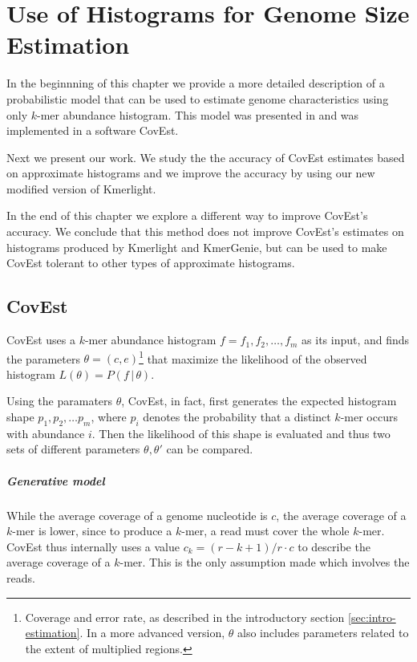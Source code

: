 \chapter{Use of Histograms for Genome Size Estimation}
\label{sec:chapter3}
In the beginnning of this chapter we provide a more detailed description of a probabilistic model
that can be used to estimate genome characteristics using only $k$-mer abundance histogram.
This model was presented in \cite{Hozza2015, Hozza2016} and was implemented in a software CovEst.

Next we present our work. We study the the accuracy of CovEst estimates based on
approximate histograms and we improve the accuracy by using our new modified version of Kmerlight.

In the end of this chapter we explore a different way to improve CovEst's accuracy. 
We conclude that this method does not improve CovEst's estimates on histograms produced by
Kmerlight and KmerGenie, but can be used to make CovEst tolerant to other types of
approximate histograms.

\section{CovEst}
\label{sec:covest}
CovEst uses a $k$-mer abundance histogram $f = f_1, f_2, \dots, f_m$ as its input,
and finds the parameters $\theta = (c, e)$\footnote{Coverage and error rate, as described 
in the introductory section \ref{sec:intro-estimation}. In a more advanced version, $\theta$
also includes parameters related to the extent of multiplied regions.} that maximize
the likelihood of the observed histogram $L(\theta) = P(f \,|\, \theta)$.

Using the paramaters $\theta$, CovEst, in fact, first generates the expected histogram
shape $p_1, p_2, \dots p_m$, where $p_i$ denotes the probability that a distinct $k$-mer
occurs with abundance $i$. Then the likelihood of this shape is evaluated and thus 
two sets of different parameters $\theta, \theta'$ can be compared.

\paragraph{Generative model}
While the average coverage of a genome nucleotide is $c$, the average coverage
of a $k$-mer is lower, since to produce a $k$-mer, a read must cover the whole
$k$-mer. CovEst thus internally uses a value $c_k = (r-k+1)/r \cdot c$ to describe the
average coverage of a $k$-mer. This is the only assumption made which involves the reads.

